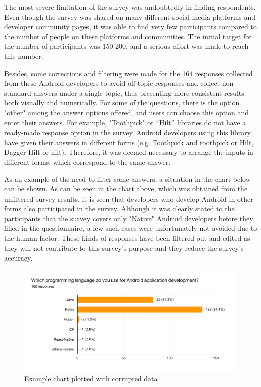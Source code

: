 The most severe limitation of the survey was undoubtedly in finding respondents. Even though the survey was shared on many different social media platforms and developer community pages, it was able to find very few participants compared to the number of people on these platforms and communities. The initial target for the number of participants was 150-200, and a serious effort was made to reach this number.

Besides, some corrections and filtering were made for the 164 responses collected from these Android developers to avoid off-topic responses and collect non-standard answers under a single topic, thus presenting more consistent results both visually and numerically. For some of the questions, there is the option "other" among the answer options offered, and users can choose this option and enter their answers. For example, "Toothpick" or “Hilt” libraries do not have a ready-made response option in the survey. Android developers using this library have given their answers in different forms (e.g. Toothpick and toothpick or Hilt, Dagger Hilt or hilt). Therefore, it was deemed necessary to arrange the inputs in different forms, which correspond to the same answer. 

As an example of the need to filter some answers, a situation in the chart below can be shown. As can be seen in the chart above, which was obtained from the unfiltered survey results, it is seen that developers who develop Android in other forms also participated in the survey. Although it was clearly stated to the participants that the survey covers only "Native" Android developers before they filled in the questionnaire, a few such cases were unfortunately not avoided due to the human factor. These kinds of responses have been filtered out and edited as they will not contribute to this survey’s purpose and they reduce the survey’s accuracy.
\begin{figure}[ht!]
    \centering
    \includegraphics[scale=0.20]{figures/survey_corrupted_chart.png}
    \caption{Example chart plotted with corrupted data}
    \label{fig:corrupted_chart_example}
\end{figure}

